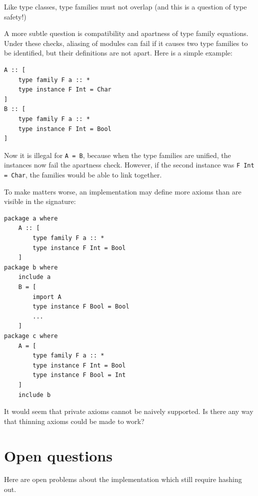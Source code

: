 \documentclass{article}
\begin{document}
Like type classes, type families must not overlap (and this is a question of
type safety!)

A more subtle question is compatibility and apartness of type family
equations.  Under these checks, aliasing of modules can fail if it causes
two type families to be identified, but their definitions are not apart.
Here is a simple example:

\begin{verbatim}
A :: [
    type family F a :: *
    type instance F Int = Char
]
B :: [
    type family F a :: *
    type instance F Int = Bool
]
\end{verbatim}

Now it is illegal for \verb|A = B|, because when the type families are
unified, the instances now fail the apartness check.  However, if the second
instance was \verb|F Int = Char|, the families would be able to link together.

To make matters worse, an implementation may define more axioms than are
visible in the signature:

\begin{verbatim}
package a where
    A :: [
        type family F a :: *
        type instance F Int = Bool
    ]
package b where
    include a
    B = [
        import A
        type instance F Bool = Bool
        ...
    ]
package c where
    A = [
        type family F a :: *
        type instance F Int = Bool
        type instance F Bool = Int
    ]
    include b
\end{verbatim}

It would seem that private axioms cannot be naively supported. Is
there any way that thinning axioms could be made to work?

\section{Open questions}\label{sec:open-questions}

Here are open problems about the implementation which still require
hashing out.
\end{document}
